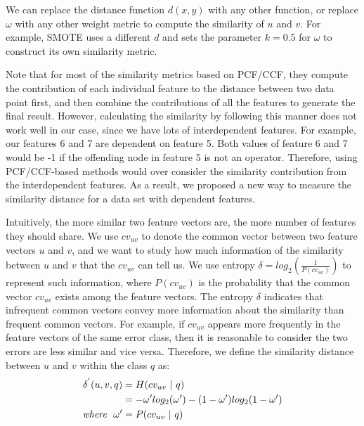 \documentclass[12pt]{report}	%
\begin{document}
We can replace the distance function $d(x,y)$ with any other
function, or replace $\omega$ with any other weight metric
to compute the similarity of $u$ and $v$.
For example, SMOTE uses a different $d$ and sets the parameter $k=0.5$
for $\omega$ to construct its own similarity metric.

Note that for most of the similarity metrics based on PCF/CCF, they
compute the contribution of each
individual feature to the
distance between two data point first, and
then combine the contributions of
all the features to generate the final result.
However, calculating the similarity by following this manner does not
work well in our case, since we have
lots of interdependent features.
For example, our features 6 and 7 are dependent
on feature 5. Both values of feature 6 and 7 would be -1
if the offending node in feature 5 is not an operator.
Therefore, using PCF/CCF-based methods
would over consider the similarity contribution from the interdependent features.
%
%
As a result,
we proposed a new way to measure the similarity
distance for a data set with dependent features.

Intuitively, the more similar two feature vectors are,
the more number of features they should share.
We use $cv_{uv}$ to denote the common vector
between two feature vectors $u$ and $v$,
and we want to study
how much information of the similarity between
$u$ and $v$ that the $cv_{uv}$ can tell us.
We use entropy $\delta = log_{2}(\frac{1}{P(cv_{uv})})$
to represent such information, 
where $P(cv_{uv})$ is the probability that
the common vector $cv_{uv}$ exists among the feature vectors.
The entropy $\delta$ indicates that
infrequent common vectors convey more
information about the similarity than frequent common vectors.
For example, if $cv_{uv}$ appears more frequently in the feature vectors of
the same error class, then it is reasonable to
consider the two errors are less similar and vice versa.
Therefore, we define the similarity distance between
$u$ and $v$ within the class $q$ as:
\begin{align*}
\delta^{'}(u, v, q) &= H(cv_{uv}\ |\ q) \\
                      &= -\omega'log_{2}(\omega') - (1-\omega')log_{2}(1-\omega') \\
                      \textit{where}\ \ \omega' &= P(cv_{uv}\ |\ q)
\end{align*}
\end{document}
